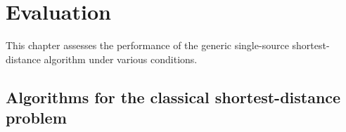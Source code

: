 
\chapter{Evaluation}

This chapter assesses the performance of the generic single-source shortest-distance algorithm under various conditions.



\section{Algorithms for the classical shortest-distance problem}

